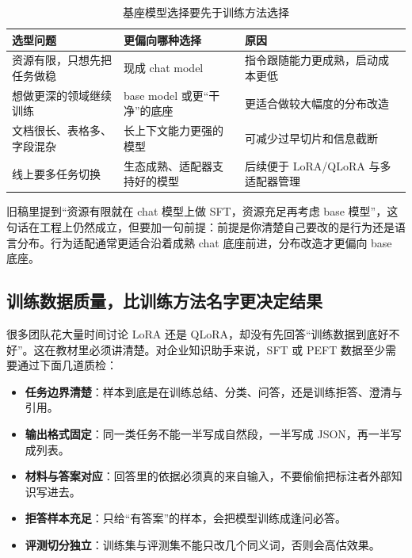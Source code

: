 \begin{table}[H]
\centering
\small
\begin{tabularx}{\textwidth}{>{\raggedright\arraybackslash}p{2.8cm}>{\raggedright\arraybackslash}p{3.5cm}>{\raggedright\arraybackslash}X}
\toprule
\textbf{选型问题} & \textbf{更偏向哪种选择} & \textbf{原因} \\
\midrule
资源有限，只想先把任务做稳 & 现成 chat model & 指令跟随能力更成熟，启动成本更低 \\
想做更深的领域继续训练 & base model 或更“干净”的底座 & 更适合做较大幅度的分布改造 \\
文档很长、表格多、字段混杂 & 长上下文能力更强的模型 & 可减少过早切片和信息截断 \\
线上要多任务切换 & 生态成熟、适配器支持好的模型 & 后续便于 LoRA/QLoRA 与多适配器管理 \\
\bottomrule
\end{tabularx}
\caption{基座模型选择要先于训练方法选择}
\label{tab:base-model-choice}
\end{table}

\begin{note}
旧稿里提到“资源有限就在 chat 模型上做 SFT，资源充足再考虑 base 模型”，这句话在工程上仍然成立，但要加一句前提：前提是你清楚自己要改的是行为还是语言分布。行为适配通常更适合沿着成熟 chat 底座前进，分布改造才更偏向 base 底座。
\end{note}

\subsection{训练数据质量，比训练方法名字更决定结果}
很多团队花大量时间讨论 LoRA 还是 QLoRA，却没有先回答“训练数据到底好不好”。这在教材里必须讲清楚。对企业知识助手来说，SFT 或 PEFT 数据至少需要通过下面几道质检：
\begin{itemize}
  \item \textbf{任务边界清楚}：样本到底是在训练总结、分类、问答，还是训练拒答、澄清与引用。
  \item \textbf{输出格式固定}：同一类任务不能一半写成自然段，一半写成 JSON，再一半写成列表。
  \item \textbf{材料与答案对应}：回答里的依据必须真的来自输入，不要偷偷把标注者外部知识写进去。
  \item \textbf{拒答样本充足}：只给“有答案”的样本，会把模型训练成逢问必答。
  \item \textbf{评测切分独立}：训练集与评测集不能只改几个同义词，否则会高估效果。
\end{itemize}

